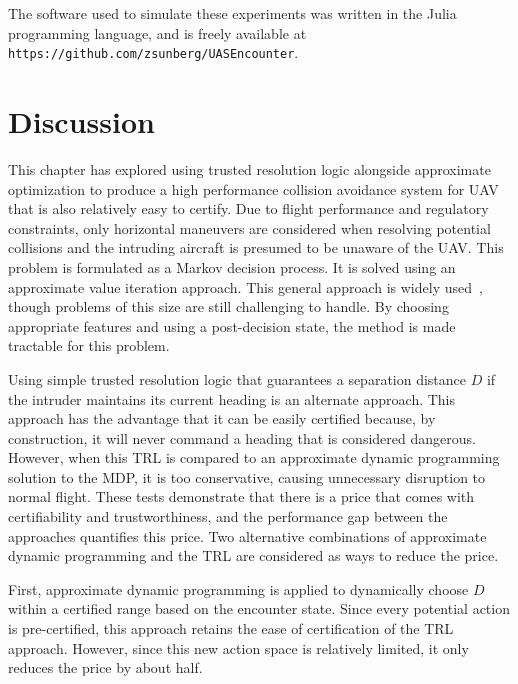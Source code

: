 The software used to simulate these experiments was written in the Julia programming language, and is freely available at \texttt{\small{https://github.com/zsunberg/UASEncounter}}.

\section{Discussion}

This chapter has explored using trusted resolution logic alongside approximate optimization to produce a high performance collision avoidance system for UAV that is also relatively easy to certify.
Due to flight performance and regulatory constraints, only horizontal maneuvers are considered when resolving potential collisions and the intruding aircraft is presumed to be unaware of the UAV.
This problem is formulated as a Markov decision process.
It is solved using an approximate value iteration approach.
This general approach is widely used~\cite{kochenderfer2015decision}, though problems of this size are still challenging to handle.
By choosing appropriate features and using a post-decision state, the method is made tractable for this problem.

Using simple trusted resolution logic that guarantees a separation distance $D$ if the intruder maintains its current heading is an alternate approach.
This approach has the advantage that it can be easily certified because, by construction, it will never command a heading that is considered dangerous.
However, when this TRL is compared to an approximate dynamic programming solution to the MDP, it is too conservative, causing unnecessary disruption to normal flight.
These tests demonstrate that there is a price that comes with certifiability and trustworthiness, and the performance gap between the approaches quantifies this price. Two alternative combinations of approximate dynamic programming and the TRL are considered as ways to reduce the price.

First, approximate dynamic programming is applied to dynamically choose $D$ within a certified range based on the encounter state.
Since every potential action is pre-certified, this approach retains the ease of certification of the TRL approach.
However, since this new action space is relatively limited, it only reduces the price by about half.

